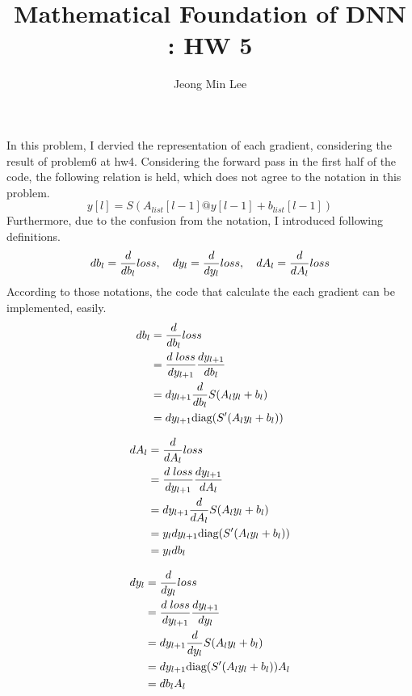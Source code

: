 \documentclass[10pt]{article}
\title{\textbf{Mathematical Foundation of DNN : HW 5}}
\author{Jeong Min Lee}
\begin{document}
\maketitle

\section{}
In this problem, I dervied the representation of each gradient, considering the result of problem6 at hw4.
Considering the forward pass in the first half of the code, the following relation is held, which does not agree to the notation in this problem.
\begin{equation*}
    y[l] = S(A_{list}[l-1]@y[l-1] + b_{list}[l-1])
\end{equation*}
Furthermore, due to the confusion from the notation, I introduced following definitions.
\begin{equation*}
    db_l = {d\over db_l}loss, \quad dy_l = {d\over dy_l}loss, \quad  dA_l = {d\over dA_l}loss
\end{equation*}
According to those notations, the code that calculate the each gradient can be implemented, easily.
\begin{align*}
    db_l &= {d\over db_l}loss \\
    &= {d\;loss\over dy_{l+1}} {d y_{l+1}\over db_l} \\
    &= dy_{l+1}{d \over db_l} S(A_ly_l + b_l)\\
    &= dy_{l+1}\text{diag}(S^\prime(A_ly_l + b_l))
\end{align*}

\begin{align*}
    dA_l &= {d\over dA_l}loss \\
    &= {d\;loss\over dy_{l+1}} {d y_{l+1}\over dA_l} \\
    &= dy_{l+1}{d \over dA_l} S(A_ly_l + b_l)\\
    &= y_ldy_{l+1}\text{diag}(S^\prime(A_ly_l + b_l)) \\
    &= y_ldb_l
\end{align*}

\begin{align*}
    dy_l &= {d\over dy_l}loss \\
    &= {d\;loss\over dy_{l+1}} {d y_{l+1}\over dy_l} \\
    &= dy_{l+1}{d \over dy_l} S(A_ly_l + b_l)\\
    &= dy_{l+1}\text{diag}(S^\prime(A_ly_l + b_l))A_l \\
    &= db_lA_l
\end{align*}
\end{document}
